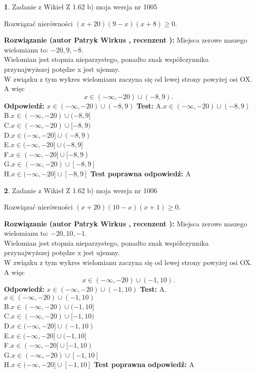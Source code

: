 \documentclass[12pt, a4paper]{article}
\theoremstyle{definition} %
\newtheorem{zad}{}
\newcommand{\zadStart}[1]{\begin{zad}#1\newline}
\newcommand{\zadStop}{\end{zad}}
\newcommand{\rozwStart}[2]{\noindent \textbf{Rozwiązanie (autor #1 , recenzent #2): }\newline}
\newcommand{\rozwStop}{\newline}
\newcommand{\odpStart}{\noindent \textbf{Odpowiedź:}\newline}
\newcommand{\odpStop}{\newline}
\newcommand{\testStart}{\noindent \textbf{Test:}\newline}
\newcommand{\testStop}{\newline}
\newcommand{\kluczStart}{\noindent \textbf{Test poprawna odpowiedź:}\newline}
\newcommand{\kluczStop}{\newline}
\begin{document}
\zadStart{Zadanie z Wikieł Z 1.62 b) moja wersja nr 1005}

Rozwiązać nierówności $(x+20)(9-x)(x+8)\ge0$.
\zadStop
\rozwStart{Patryk Wirkus}{}
Miejsca zerowe naszego wielomianu to: $-20, 9, -8$.\\
Wielomian jest stopnia nieparzystego, ponadto znak współczynnika przy\linebreak najwyższej potędze x jest ujemny.\\ W związku z tym wykres wielomianu zaczyna się od lewej strony powyżej osi OX. A więc $$x \in (-\infty,-20) \cup (-8,9).$$
\rozwStop
\odpStart
$x \in (-\infty,-20) \cup (-8,9)$
\odpStop
\testStart
A.$x \in (-\infty,-20) \cup (-8,9)$\\
B.$x \in (-\infty,-20) \cup (-8,9]$\\
C.$x \in (-\infty,-20) \cup [-8,9)$\\
D.$x \in (-\infty,-20] \cup (-8,9)$\\
E.$x \in (-\infty,-20] \cup (-8,9]$\\
F.$x \in (-\infty,-20] \cup [-8,9)$\\
G.$x \in (-\infty,-20) \cup [-8,9]$\\
H.$x \in (-\infty,-20] \cup [-8,9]$
\testStop
\kluczStart
A
\kluczStop



\zadStart{Zadanie z Wikieł Z 1.62 b) moja wersja nr 1006}

Rozwiązać nierówności $(x+20)(10-x)(x+1)\ge0$.
\zadStop
\rozwStart{Patryk Wirkus}{}
Miejsca zerowe naszego wielomianu to: $-20, 10, -1$.\\
Wielomian jest stopnia nieparzystego, ponadto znak współczynnika przy\linebreak najwyższej potędze x jest ujemny.\\ W związku z tym wykres wielomianu zaczyna się od lewej strony powyżej osi OX. A więc $$x \in (-\infty,-20) \cup (-1,10).$$
\rozwStop
\odpStart
$x \in (-\infty,-20) \cup (-1,10)$
\odpStop
\testStart
A.$x \in (-\infty,-20) \cup (-1,10)$\\
B.$x \in (-\infty,-20) \cup (-1,10]$\\
C.$x \in (-\infty,-20) \cup [-1,10)$\\
D.$x \in (-\infty,-20] \cup (-1,10)$\\
E.$x \in (-\infty,-20] \cup (-1,10]$\\
F.$x \in (-\infty,-20] \cup [-1,10)$\\
G.$x \in (-\infty,-20) \cup [-1,10]$\\
H.$x \in (-\infty,-20] \cup [-1,10]$
\testStop
\kluczStart
A
\kluczStop
\end{document}
